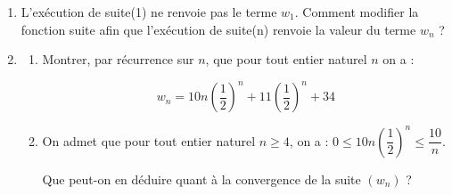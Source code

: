 \documentclass[10pt]{article}
\begin{document}
\begin{enumerate}[resume]

\item L'exécution de suite(1) ne renvoie pas le terme $w_{1}$. Comment modifier la fonction suite afin que l'exécution de suite(n) renvoie la valeur du terme $w_{n}$ ?
\item 
\begin{enumerate}
	\item Montrer, par récurrence sur $n$, que pour tout entier naturel $n$ on a :

\[w_{n}=10 n\left(\dfrac{1}{2}\right)^{n}+11\left(\dfrac{1}{2}\right)^{n}+ 34\]

\item  On admet que pour tout entier naturel $n \geqslant 4$, on a : $0 \leqslant 10 n\left(\dfrac{1}{2}\right)^{n} \leqslant \dfrac{10}{n}$.

Que peut-on en déduire quant à la convergence de la suite $\left(w_{n}\right)$ ?
\end{enumerate}
\end{enumerate}

\bigskip
\end{document}
